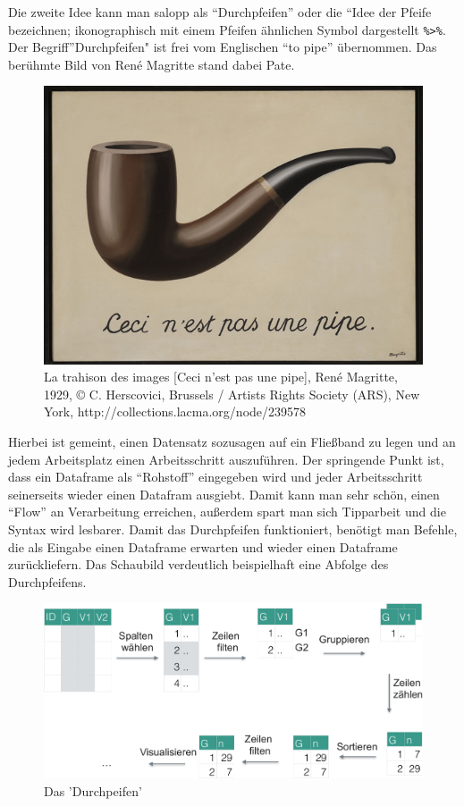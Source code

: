 \documentclass[12pt,ngerman,]{book}
\begin{document}
Die zweite Idee kann man salopp als ``Durchpfeifen'' oder
die ``Idee der Pfeife bezeichnen; ikonographisch mit einem
Pfeifen ähnlichen Symbol dargestellt \texttt{\%\textgreater{}\%}. Der
Begriff''Durchpfeifen" ist frei vom Englischen ``to pipe'' übernommen.
Das berühmte Bild von René Magritte stand dabei Pate.

\begin{figure}

{\centering \includegraphics[width=0.7\linewidth]{images/Datenjudo/ma-150089-WEB} 

}

\caption{La trahison des images [Ceci n'est pas une pipe], René Magritte, 1929, © C. Herscovici, Brussels / Artists Rights Society (ARS), New York, http://collections.lacma.org/node/239578}\label{fig:cecie-une-pipe}
\end{figure}

Hierbei ist gemeint, einen Datensatz sozusagen auf ein Fließband zu
legen und an jedem Arbeitsplatz einen Arbeitsschritt auszuführen. Der
springende Punkt ist, dass ein Dataframe als ``Rohstoff'' eingegeben
wird und jeder Arbeitsschritt seinerseits wieder einen Datafram
ausgiebt. Damit kann man sehr schön, einen ``Flow'' an Verarbeitung
erreichen, außerdem spart man sich Tipparbeit und die Syntax wird
lesbarer. Damit das Durchpfeifen funktioniert, benötigt man Befehle, die
als Eingabe einen Dataframe erwarten und wieder einen Dataframe
zurückliefern. Das Schaubild verdeutlich beispielhaft eine Abfolge des
Durchpfeifens.

\begin{figure}

{\centering \includegraphics[width=0.8\linewidth]{images/Datenjudo/durchpfeifen} 

}

\caption{Das 'Durchpeifen'}\label{fig:fig-durchpreifen}
\end{figure}
\end{document}
